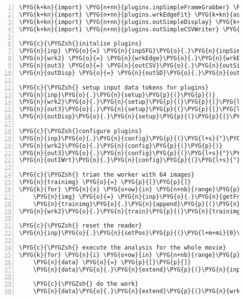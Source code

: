 \begin{Verbatim}[commandchars=\\\{\},numbers=left,stepnumber=1,codes={\catcode`\$=3\catcode`\^=7\catcode`\_=8}]
\PYG{k+kn}{import} \PYG{n+nn}{plugins.inpSimpleFrameGrabber} \PYG{k+kn}{as} \PYG{n+nn}{inpSFG}
\PYG{k+kn}{import} \PYG{n+nn}{plugins.wrkEdgeFit} \PYG{k+kn}{as} \PYG{n+nn}{wrkEdge}
\PYG{k+kn}{import} \PYG{n+nn}{plugins.outSimpleDisplay} \PYG{k+kn}{as} \PYG{n+nn}{outSD}
\PYG{k+kn}{import} \PYG{n+nn}{plugins.outSimpleCSVWriter} \PYG{k+kn}{as} \PYG{n+nn}{outCSV}

\PYG{c}{\PYGZsh{}initalise plugins}
\PYG{n}{inp} \PYG{o}{=} \PYG{n}{inpSFG}\PYG{o}{.}\PYG{n}{inpSimpleFrameGrabber}\PYG{p}{(}\PYG{p}{)}
\PYG{n}{wrk2} \PYG{o}{=} \PYG{n}{wrkEdge}\PYG{o}{.}\PYG{n}{wrkEdgeFit}\PYG{p}{(}\PYG{p}{)}
\PYG{n}{out3} \PYG{o}{=} \PYG{n}{outCSV}\PYG{o}{.}\PYG{n}{outSimpleCSVWriter}\PYG{p}{(}\PYG{p}{)}
\PYG{n}{outDisp} \PYG{o}{=} \PYG{n}{outSD}\PYG{o}{.}\PYG{n}{outSimpleDisplay}\PYG{p}{(}\PYG{p}{)}

\PYG{c}{\PYGZsh{} setup input data tokens for plugins}
\PYG{n}{inp}\PYG{o}{.}\PYG{n}{setup}\PYG{p}{(}\PYG{p}{)}
\PYG{n}{wrk2}\PYG{o}{.}\PYG{n}{setup}\PYG{p}{(}\PYG{p}{[}\PYG{l+m+mi}{1}\PYG{p}{]}\PYG{p}{)}
\PYG{n}{out3}\PYG{o}{.}\PYG{n}{setup}\PYG{p}{(}\PYG{p}{[}\PYG{l+m+mi}{0}\PYG{p}{,}\PYG{l+m+mi}{2}\PYG{p}{]}\PYG{p}{)}
\PYG{n}{outDisp}\PYG{o}{.}\PYG{n}{setup}\PYG{p}{(}\PYG{p}{[}\PYG{l+m+mi}{0}\PYG{p}{,}\PYG{l+m+mi}{1}\PYG{p}{]}\PYG{p}{)}

\PYG{c}{\PYGZsh{}configure plugins}
\PYG{n}{inp}\PYG{o}{.}\PYG{n}{config}\PYG{p}{(}\PYG{l+s}{"}\PYG{l+s}{move.avi}\PYG{l+s}{"}\PYG{p}{)}
\PYG{n}{wrk2}\PYG{o}{.}\PYG{n}{config}\PYG{p}{(}\PYG{p}{)}
\PYG{n}{out3}\PYG{o}{.}\PYG{n}{config}\PYG{p}{(}\PYG{l+s}{"}\PYG{l+s}{csvfile.csv}\PYG{l+s}{"}\PYG{p}{)}
\PYG{n}{outIWrt}\PYG{o}{.}\PYG{n}{config}\PYG{p}{(}\PYG{l+s}{"}\PYG{l+s}{path/for/images}\PYG{l+s}{"}\PYG{p}{)}

\PYG{c}{\PYGZsh{} trian the worker with 64 images}
\PYG{n}{trainimg} \PYG{o}{=} \PYG{p}{[}\PYG{p}{]}
\PYG{k}{for} \PYG{n}{x} \PYG{o+ow}{in} \PYG{n+nb}{range}\PYG{p}{(}\PYG{l+m+mi}{64}\PYG{p}{)}\PYG{p}{:}
    \PYG{n}{img} \PYG{o}{=} \PYG{n}{inp}\PYG{o}{.}\PYG{n}{getFrameNr}\PYG{p}{(}\PYG{n}{inp}\PYG{o}{.}\PYG{n}{nFrames}\PYG{o}{/}\PYG{o}{/}\PYG{l+m+mi}{64}\PYG{o}{*}\PYG{n}{x}\PYG{p}{)}\PYG{p}{[}\PYG{l+m+mi}{1}\PYG{p}{]}
    \PYG{n}{trainimg}\PYG{o}{.}\PYG{n}{append}\PYG{p}{(}\PYG{n}{img}\PYG{p}{)}
\PYG{n}{wrk2}\PYG{o}{.}\PYG{n}{train}\PYG{p}{(}\PYG{n}{trainimg}\PYG{p}{)}

\PYG{c}{\PYGZsh{} reset the reader}
\PYG{n}{inp}\PYG{o}{.}\PYG{n}{setPos}\PYG{p}{(}\PYG{l+m+mi}{0}\PYG{p}{)}

\PYG{c}{\PYGZsh{} execute the analysis for the whole movie}
\PYG{k}{for} \PYG{n}{i} \PYG{o+ow}{in} \PYG{n+nb}{range}\PYG{p}{(}\PYG{n}{inp}\PYG{o}{.}\PYG{n}{nFrames}\PYG{p}{)}\PYG{p}{:}
    \PYG{n}{data} \PYG{o}{=} \PYG{p}{[}\PYG{p}{]}
    \PYG{n}{data}\PYG{o}{.}\PYG{n}{extend}\PYG{p}{(}\PYG{n}{inp}\PYG{p}{(}\PYG{p}{)}\PYG{p}{)}

    \PYG{c}{\PYGZsh{} do the work}
    \PYG{n}{data}\PYG{o}{.}\PYG{n}{extend}\PYG{p}{(}\PYG{n}{wrk2}\PYG{p}{(}\PYG{n}{data}\PYG{p}{)}\PYG{p}{)} \PYG{c}{\PYGZsh{}save each 25th frame}
\end{Verbatim}
